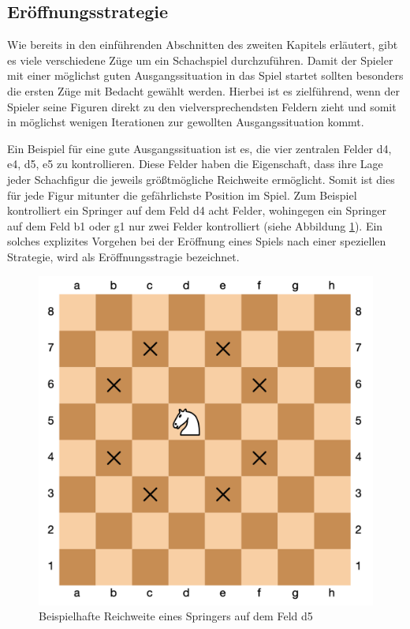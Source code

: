 \subsection{Eröffnungsstrategie}\label{opening_evaluation}
Wie bereits in den einführenden Abschnitten des zweiten Kapitels erläutert, gibt es viele verschiedene Züge um ein Schachspiel durchzuführen. Damit der Spieler mit einer möglichst guten Ausgangssituation in das Spiel startet sollten besonders die ersten Züge mit Bedacht gewählt werden. Hierbei ist es zielführend, wenn der Spieler seine Figuren direkt zu den vielversprechendsten Feldern zieht und somit in möglichst wenigen Iterationen zur gewollten Ausgangssituation kommt.

Ein Beispiel für eine gute Ausgangssituation ist es, die vier zentralen Felder d4, e4, d5, e5 zu kontrollieren. Diese Felder haben die Eigenschaft, dass ihre Lage jeder Schachfigur die jeweils größtmögliche Reichweite ermöglicht. Somit ist dies für jede Figur mitunter die gefährlichste Position im Spiel. Zum Beispiel kontrolliert ein Springer auf dem Feld d4 acht Felder, wohingegen ein Springer auf dem Feld b1 oder g1 nur zwei Felder kontrolliert (siehe Abbildung \ref{fig:knight_reach}). Ein solches explizites Vorgehen bei der Eröffnung eines Spiels nach einer speziellen Strategie, wird als Eröffnungsstragie bezeichnet. 

\begin{figure}[h]
\centering
\includegraphics[width=\textwidth/2]{images/opening-books-strong-center-example.png}

\caption{Beispielhafte Reichweite eines Springers auf dem Feld d5 \cite{}}\label{fig:knight_reach}
\end{figure}


